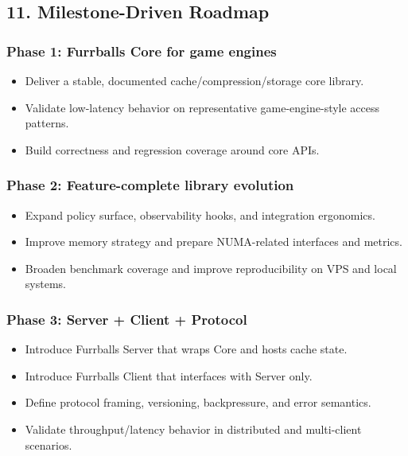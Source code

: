 \documentclass[
  english,
  letterpaper,
  DIV=11,
  numbers=noendperiod]{scrartcl}
\providecommand{\tightlist}{%
  \setlength{\itemsep}{0pt}\setlength{\parskip}{0pt}}
\begin{document}
\subsection{11. Milestone-Driven
Roadmap}\label{milestone-driven-roadmap}

\subsubsection{Phase 1: Furrballs Core for game
engines}\label{phase-1-furrballs-core-for-game-engines}

\begin{itemize}
\tightlist
\item
  Deliver a stable, documented cache/compression/storage core library.
\item
  Validate low-latency behavior on representative game-engine-style
  access patterns.
\item
  Build correctness and regression coverage around core APIs.
\end{itemize}

\subsubsection{Phase 2: Feature-complete library
evolution}\label{phase-2-feature-complete-library-evolution}

\begin{itemize}
\tightlist
\item
  Expand policy surface, observability hooks, and integration
  ergonomics.
\item
  Improve memory strategy and prepare NUMA-related interfaces and
  metrics.
\item
  Broaden benchmark coverage and improve reproducibility on VPS and
  local systems.
\end{itemize}

\subsubsection{Phase 3: Server + Client +
Protocol}\label{phase-3-server-client-protocol}

\begin{itemize}
\tightlist
\item
  Introduce Furrballs Server that wraps Core and hosts cache state.
\item
  Introduce Furrballs Client that interfaces with Server only.
\item
  Define protocol framing, versioning, backpressure, and error
  semantics.
\item
  Validate throughput/latency behavior in distributed and multi-client
  scenarios.
\end{itemize}
\end{document}
